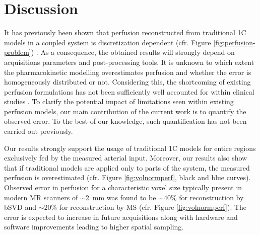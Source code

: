 \documentclass[final,5p,times,twocolumn]{elsarticle}
\begin{document}
	
	
	\section{Discussion}\label{sec:conclusion}

It has previously been shown that perfusion reconstructed from traditional 1C models in a coupled system is discretization dependent (cfr. Figure \ref{fig:perfusion-problem}) \cite{Henkelman1990,Guibert2013,sourbron14}. As a consequence, the obtained results will strongly depend on acquisitions parameters and post-processing tools. It is unknown to which extent the pharmacokinetic modelling overestimates perfusion and whether the error is homogeneously distributed or not. Considering this, the shortcoming of existing perfusion formulations has not been sufficiently well accounted for within clinical studies \cite{Mokin16,Kickingereder15}. To clarify the potential impact of limitations seen within existing perfusion models, our main contribution of the current work is to quantify the observed error. To the best of our knowledge, such quantification has not been carried out previously.

	Our results strongly support the usage of traditional 1C models for entire regions exclusively fed by the measured arterial input. Moreover, our results also show that if traditional models are applied only to parts of the system, the measured perfusion is overestimated (cfr. Figure \ref{fig:volnormperf}, black and blue curves). Observed error in perfusion for a characteristic voxel size typically present in modern MR scanners of $\sim$\SI{2}{\milli\meter} was found to be $\sim$$40\%$ for reconstruction by bSVD and $\sim$$20\%$ for reconstruction by MS (cfr. Figure \ref{fig:volnormperf}). The error is expected to increase in future acquisitions along with hardware and software improvements leading to higher spatial sampling.
		
\end{document}
